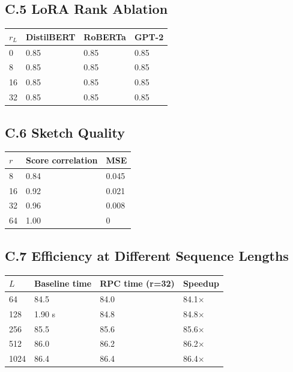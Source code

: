 \subsection{C.5 LoRA Rank Ablation}

\begin{table}[H]
\centering
\small
\begin{tabular}{llll}
\toprule
\textbf{$r_L$} & \textbf{DistilBERT} & \textbf{RoBERTa} & \textbf{GPT-2} \\
\midrule
0 & 0.85 & 0.85 & 0.85 \\
8 & 0.85 & 0.85 & 0.85 \\
16 & 0.85 & 0.85 & 0.85 \\
32 & 0.85 & 0.85 & 0.85 \\
\bottomrule
\end{tabular}
\end{table}

\subsection{C.6 Sketch Quality}

\begin{table}[H]
\centering
\small
\begin{tabular}{lll}
\toprule
\textbf{$r$} & \textbf{Score correlation} & \textbf{MSE} \\
\midrule
8 & 0.84 & 0.045 \\
16 & 0.92 & 0.021 \\
32 & 0.96 & 0.008 \\
64 & 1.00 & 0 \\
\bottomrule
\end{tabular}
\end{table}

\subsection{C.7 Efficiency at Different Sequence Lengths}

\begin{table}[H]
\centering
\small
\begin{tabular}{llll}
\toprule
\textbf{$L$} & \textbf{Baseline time} & \textbf{RPC time (r=32)} & \textbf{Speedup} \\
\midrule
64 & 84.5 & 84.0 & 84.1$\times$ \\
128 & 1.90 s & 84.8 & 84.8$\times$ \\
256 & 85.5 & 85.6 & 85.6$\times$ \\
512 & 86.0 & 86.2 & 86.2$\times$ \\
1024 & 86.4 & 86.4 & 86.4$\times$ \\
\bottomrule
\end{tabular}
\end{table}


